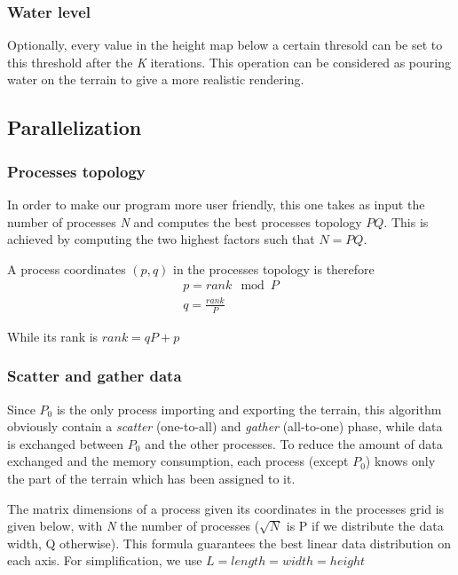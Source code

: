 \subsubsection{Water level}
Optionally, every value in the height map below a certain thresold can be set to this threshold after the \textit{K} iterations. This operation can be considered as pouring water on the terrain to give a more realistic rendering.


\subsection{Parallelization}
\subsubsection{Processes topology}
In order to make our program more user friendly, this one takes as input the number of processes \textit{N} and computes the best processes topology $P Q$. This is achieved by computing the two highest factors such that $N = P Q$.

A process coordinates $(p, q)$ in the processes topology is therefore
\begin{equation}
\begin{split}
p = rank \mod P\\
q = \frac{rank}{P}
\end{split}
\end{equation}

While its rank is $rank = q  P + p$

\subsubsection{Scatter and gather data}
Since $P_0$ is the only process importing and exporting the terrain, this algorithm obviously contain a \textit{scatter} (one-to-all) and \textit{gather} (all-to-one) phase, while data is exchanged between $P_0$ and the other processes. To reduce the amount of data exchanged and the memory consumption, each process (except $P_0$) knows only the part of the terrain which has been assigned to it.

The matrix dimensions of a process given its coordinates in the processes grid is given below, with \textit{N} the number of processes ($\sqrt{N}$ is P if we distribute the data width, Q otherwise). This formula guarantees the best linear data distribution on each axis. For simplification, we use $L = length = width = height$

